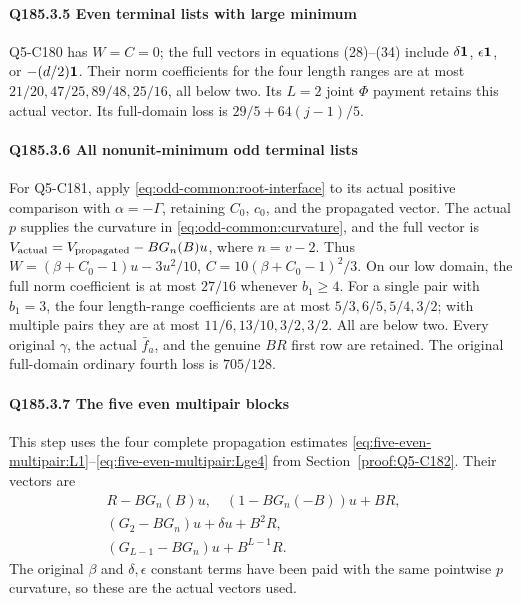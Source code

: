 \paragraph{Q185.3.5 Even terminal lists with large minimum}

Q5-C180 has \(W=C=0\); the full vectors in equations (28)--(34) include \(\delta\mathbf1\), \(\epsilon\mathbf1\), or \(-(d/2)\mathbf1\). Their norm coefficients for the four length ranges are at most \(21/20,\allowbreak \allowbreak  47/25,\allowbreak \allowbreak  89/48,\allowbreak \allowbreak  25/16\), all below two. Its \(L=2\) joint \(\Phi\) payment retains this actual vector. Its full-domain loss is \(29/5+64(j-1)/5\).

\paragraph{Q185.3.6 All nonunit-minimum odd terminal lists}

For Q5-C181, apply \eqref{eq:odd-common:root-interface} to its actual positive comparison with \(\alpha=-\Gamma\), retaining \(C_0\), \(c_0\), and the propagated vector. The actual \(p\) supplies the curvature in \eqref{eq:odd-common:curvature}, and the full vector is \(V_{\rm actual}=V_{\rm propagated}-BG_n(B)u\), where \(n=v-2\). Thus \(W=(\beta+C_0-1)u-3u^2/10\), \(C=10(\beta+C_0-1)^2/3\). On our low domain, the full norm coefficient is at most \(27/16\) whenever \(b_1\ge4\). For a single pair with \(b_1=3\), the four length-range coefficients are at most \(5/3,\allowbreak \allowbreak  6/5,\allowbreak \allowbreak  5/4,\allowbreak \allowbreak  3/2\); with multiple pairs they are at most \(11/6,\allowbreak \allowbreak  13/10,\allowbreak \allowbreak  3/2,\allowbreak \allowbreak  3/2\). All are below two. Every original \(\gamma\), the actual \(\bar f_a\), and the genuine \(BR\) first row are retained. The original full-domain ordinary fourth loss is \(705/128\).

\paragraph{Q185.3.7 The five even multipair blocks}

This step uses the four complete propagation estimates \eqref{eq:five-even-multipair:L1}--\eqref{eq:five-even-multipair:Lge4} from Section~\ref{proof:Q5-C182}. Their vectors are
\[
\begin{gathered}
R-BG_n(B)u,\quad (1-BG_n(-B))u+BR,\quad\\
(G_2-BG_n)u+\delta u+B^2R,\quad\\
(G_{L-1}-BG_n)u+B^{L-1}R.
\end{gathered}\tag{Q185.16}
\]
The original \(\beta\) and \(\delta,\epsilon\) constant terms have been paid with the same pointwise \(p\) curvature, so these are the actual vectors used.

